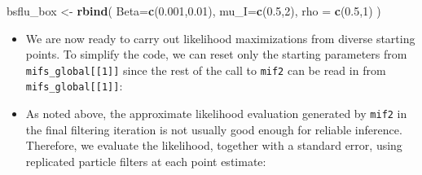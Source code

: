 \documentclass[]{article}
\newenvironment{Shaded}{\begin{snugshade}}{\end{snugshade}}
\newcommand{\KeywordTok}[1]{\textcolor[rgb]{0.13,0.29,0.53}{\textbf{#1}}}
\newcommand{\DataTypeTok}[1]{\textcolor[rgb]{0.13,0.29,0.53}{#1}}
\newcommand{\DecValTok}[1]{\textcolor[rgb]{0.00,0.00,0.81}{#1}}
\newcommand{\FloatTok}[1]{\textcolor[rgb]{0.00,0.00,0.81}{#1}}
\newcommand{\StringTok}[1]{\textcolor[rgb]{0.31,0.60,0.02}{#1}}
\newcommand{\ControlFlowTok}[1]{\textcolor[rgb]{0.13,0.29,0.53}{\textbf{#1}}}
\newcommand{\OperatorTok}[1]{\textcolor[rgb]{0.81,0.36,0.00}{\textbf{#1}}}
\newcommand{\NormalTok}[1]{#1}
\providecommand{\tightlist}{%
  \setlength{\itemsep}{0pt}\setlength{\parskip}{0pt}}
\begin{document}
\begin{Shaded}
\begin{Highlighting}[]
\NormalTok{bsflu_box <-}\StringTok{ }\KeywordTok{rbind}\NormalTok{(}
  \DataTypeTok{Beta=}\KeywordTok{c}\NormalTok{(}\FloatTok{0.001}\NormalTok{,}\FloatTok{0.01}\NormalTok{),}
  \DataTypeTok{mu_I=}\KeywordTok{c}\NormalTok{(}\FloatTok{0.5}\NormalTok{,}\DecValTok{2}\NormalTok{),}
  \DataTypeTok{rho =} \KeywordTok{c}\NormalTok{(}\FloatTok{0.5}\NormalTok{,}\DecValTok{1}\NormalTok{)}
\NormalTok{)}
\end{Highlighting}
\end{Shaded}

\begin{itemize}
\tightlist
\item
  We are now ready to carry out likelihood maximizations from diverse
  starting points. To simplify the code, we can reset only the starting
  parameters from \texttt{mifs\_global{[}{[}1{]}{]}} since the rest of
  the call to \texttt{mif2} can be read in from
  \texttt{mifs\_global{[}{[}1{]}{]}}:
\end{itemize}

\begin{Shaded}
\end{Shaded}

\begin{itemize}
\tightlist
\item
  As noted above, the approximate likelihood evaluation generated by
  \texttt{mif2} in the final filtering iteration is not usually good
  enough for reliable inference. Therefore, we evaluate the likelihood,
  together with a standard error, using replicated particle filters at
  each point estimate:
\end{itemize}
\end{document}
